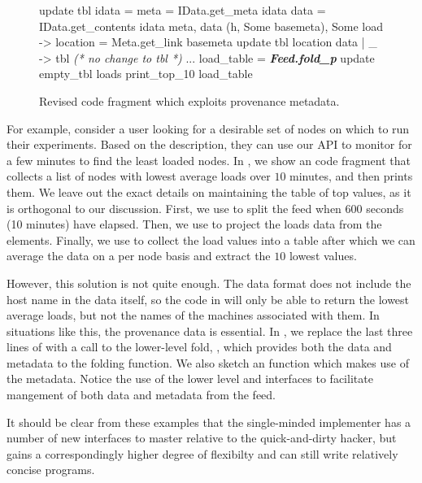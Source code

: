 \begin{figure}[tb]

\begin{codebox}
 update tbl idata =
   meta = IData.get_meta idata 
   data = IData.get_contents idata 
   meta, data  
    (h, Some basemeta), Some load ->
       location = Meta.get_link basemeta 
      update tbl location data
  | _ -> tbl \textit{ (* no change to tbl *)}
 ...
 load_table = \textit{\textbf{Feed.fold_p}} update empty_tbl loads
 print_top_10 load_table
\end{codebox}
  \caption{Revised code fragment which exploits provenance metadata. }
\label{fig:sample-loads-prov}
\end{figure}

For example, consider a \planetlab user looking for a desirable set of
nodes on which to run their experiments. Based on the \comon
description, they can use our API to monitor \planetlab for a few
minutes to find the least loaded nodes. In ,
we show an \ocaml code fragment that collects a list of nodes with
lowest average loads over $10$ minutes, and then prints them. We leave
out the exact details on maintaining the table of top values, as it is
orthogonal to our discussion. First, we use  to
split the feed when 600 seconds (10 minutes) have elapsed. Then, we
use  to project the loads data from the\comon
elements. Finally, we use  to collect the load values
into a table after which we can average the data on a per node basis
and extract the $10$ lowest values.

However, this solution is not quite enough. The \comon data format
does not include the host name in the data itself, so the code in
 will only be able to return the lowest
average loads, but not the names of the machines associated with
them. In situations like this, the provenance data is essential.  In
, we replace the last three lines of
 with a call to the lower-level fold,
, which provides both the data and metadata to the folding
function. We also sketch an  function which makes use of 
the metadata.   Notice the use of the lower level  and
 interfaces to facilitate mangement of both data and 
metadata from the feed. 

It should be clear from these examples that the single-minded implementer
has a number of new interfaces to master relative to the quick-and-dirty
hacker, but gains a correspondingly higher degree of flexibilty and can
still write relatively concise programs.

